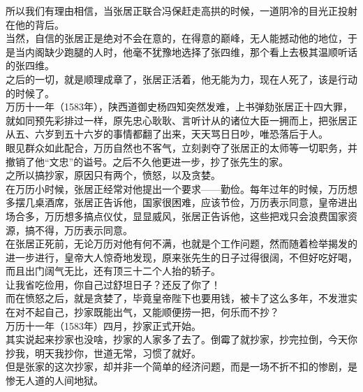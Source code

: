 \begin{multicols}{\theparacolNo}
所以我们有理由相信，当张居正联合冯保赶走高拱的时候，一道阴冷的目光正投射在他的背后。\\

当然，自信的张居正是绝对不会在意的，在得意的巅峰，无人能撼动他的地位，于是当内阁缺少跑腿的人时，他毫不犹豫地选择了张四维，那个看上去极其温顺听话的张四维。\\

之后的一切，就是顺理成章了，张居正活着，他无能为力，现在人死了，该是行动的时候了。\\

万历十一年（1583年），陕西道御史杨四知突然发难，上书弹劾张居正十四大罪，就如同预先彩排过一样，原先忠心耿耿、言听计从的诸位大臣一拥而上，把张居正从五、六岁到五十六岁的事情都翻了出来，天天骂日日吵，唯恐落后于人。\\

眼见群众如此配合，万历自然也不客气，立刻剥夺了张居正的太师等一切职务，并撤销了他“文忠”的谥号。之后不久他更进一步，抄了张先生的家。\\

之所以搞抄家，原因只有两个，愤怒，以及贪婪。\\

在万历小时候，张居正经常对他提出一个要求——勤俭。每年过年的时候，万历想多摆几桌酒席，张居正告诉他，国家很困难，应该节俭，万历表示同意，皇帝进出场合多，万历想多搞点仪仗，显显威风，张居正告诉他，这些把戏只会浪费国家资源，搞不得，万历表示同意。\\

在张居正死前，无论万历对他有何不满，也就是个工作问题，然而随着检举揭发的进一步进行，皇帝大人惊奇地发现，原来张先生的日子过得很阔，不但好吃好喝，而且出门阔气无比，还有顶三十二个人抬的轿子。\\

让我省吃俭用，你自己过舒坦日子？还反了你了！\\

而在愤怒之后，就是贪婪了，毕竟皇帝陛下也要用钱，被卡了这么多年，不发泄实在对不起自己，抄家既能出气，又能顺便捞一把，何乐而不抄？\\

万历十一年（1583年）四月，抄家正式开始。\\

其实说起来抄家也没啥，抄家的人家多了去了。倒霉了就抄家，抄完拉倒，今天你抄我，明天我抄你，世道无常，习惯了就好。\\

但是张家的这次抄家，却并非一个简单的经济问题，而是一场不折不扣的惨剧，是惨无人道的人间地狱。\\


\end{multicols}
